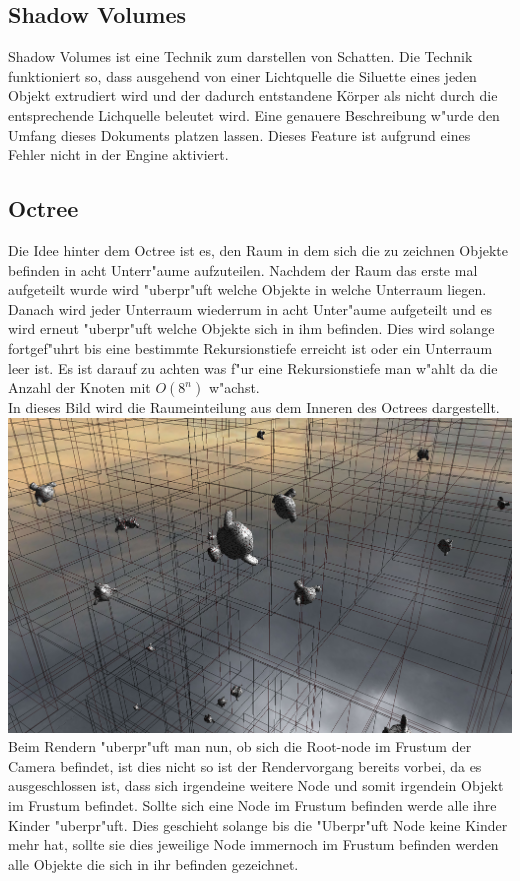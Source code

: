 \documentclass[a4paper,titlepage]{article}
\begin{document}
\subsection{Shadow Volumes}
Shadow Volumes ist eine Technik zum darstellen von Schatten. Die Technik funktioniert so, dass ausgehend von 
einer Lichtquelle die Siluette eines jeden Objekt extrudiert wird und der dadurch entstandene Körper als nicht
durch die entsprechende Lichquelle beleutet wird. Eine genauere Beschreibung w"urde den Umfang dieses Dokuments
platzen lassen. Dieses Feature ist aufgrund eines Fehler nicht in der Engine aktiviert.

\subsection{Octree}
Die Idee hinter dem Octree ist es, den Raum in dem sich die zu zeichnen Objekte befinden in acht Unterr"aume 
aufzuteilen. Nachdem der Raum das erste mal aufgeteilt wurde wird "uberpr"uft welche Objekte in welche Unterraum 
liegen. Danach wird jeder Unterraum wiederrum in acht Unter"aume aufgeteilt und es wird erneut "uberpr"uft 
welche Objekte sich in ihm befinden. Dies wird solange fortgef"uhrt bis eine bestimmte Rekursionstiefe 
erreicht ist oder ein Unterraum leer ist. Es ist darauf zu achten was f"ur eine Rekursionstiefe man w"ahlt 
da die Anzahl der Knoten mit 
$O(8^n)$ w"achst.\\

In dieses Bild wird die Raumeinteilung aus dem Inneren des Octrees dargestellt.\\
\includegraphics[width = 1.0\textwidth]{oc1.png}\\

Beim Rendern "uberpr"uft man nun, ob sich die Root-node im Frustum der Camera befindet, ist dies nicht so ist 
der Rendervorgang bereits vorbei, da es ausgeschlossen ist, dass sich irgendeine weitere Node und somit 
irgendein Objekt im Frustum befindet. Sollte sich eine Node im Frustum befinden werde alle ihre Kinder 
"uberpr"uft. Dies geschieht solange bis die "Uberpr"uft Node keine Kinder mehr hat, sollte sie dies jeweilige Node
immernoch im Frustum befinden werden alle Objekte die sich in ihr befinden gezeichnet.\\
\end{document}
